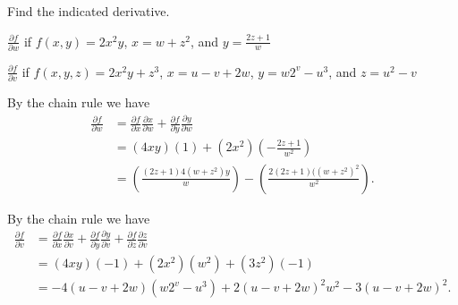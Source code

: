\begin{activity} \label{A:10.5.2} Find the indicated derivative.
	\ba	
	\item $\frac{\partial f}{\partial w}$ if $f(x,y) = 2x^2y$, $x=w+z^2$, and $y=\frac{2z+1}{w}$



	\item $\frac{\partial f}{\partial v}$ if $f(x,y,z) = 2x^2y+z^3$, $x=u-v+2w$, $y=w2^v-u^3$, and $z = u^2-v$



	\ea


\end{activity}
\begin{smallhint}

\end{smallhint}
\begin{bighint}

\end{bighint}
\begin{activitySolution}
\ba 
\item By the chain rule we have
\begin{align*}
\frac{\partial f}{\partial w} &= \frac{\partial f}{\partial x} \frac{\partial x}{\partial w}+ \frac{\partial f}{\partial y} \frac{\partial y}{\partial w} \\
	&= \left( 4xy \right)\left( 1 \right) + \left( 2x^2 \right)\left( -\frac{2z+1}{w^2} \right) \\
	&= \left( \frac{(2z+1)4(w+z^2)y}{w} \right) - \left( \frac{2(2z+1)((w+z^2)^2}{w^2} \right).
\end{align*}

\item By the chain rule we have
\begin{align*}
\frac{\partial f}{\partial v} &= \frac{\partial f}{\partial x} \frac{\partial x}{\partial v}+ \frac{\partial f}{\partial y} \frac{\partial y}{\partial v} + \frac{\partial f}{\partial z} \frac{\partial z}{\partial v} \\
	&= \left( 4xy \right)\left( -1 \right) + \left( 2x^2 \right)\left( w^2 \right) + \left( 3z^2 \right)\left( -1 \right)  \\
	&= -4(u-v+2w)(w2^v-u^3) + 2(u-v+2w)^2w^2 - 3(u-v+2w)^2.
\end{align*}

\ea
\end{activitySolution}
\aftera
